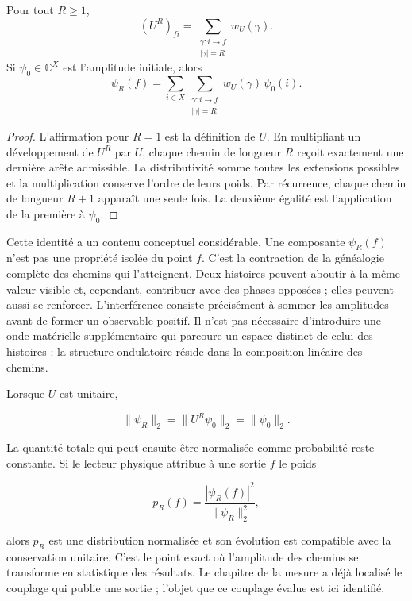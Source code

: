 \begin{theorem}
Pour tout \(R\geq 1\),
\[
  (U^R)_{fi}
  =
  \sum_{\substack{\gamma:i\to f\\|\gamma|=R}}
  w_U(\gamma).
\]
Si \(\psi_0\in\mathbb C^X\) est l'amplitude initiale, alors
\[
  \psi_R(f)
  =
  \sum_{i\in X}
  \sum_{\substack{\gamma:i\to f\\|\gamma|=R}}
  w_U(\gamma)\,\psi_0(i).
\]
\end{theorem}

\begin{proof}
L'affirmation pour \(R=1\) est la définition de \(U\). En multipliant un développement
de \(U^R\) par \(U\), chaque chemin de longueur \(R\) reçoit exactement une dernière
arête admissible. La distributivité somme toutes les extensions possibles et la
multiplication conserve l'ordre de leurs poids. Par récurrence, chaque chemin de longueur
\(R+1\) apparaît une seule fois. La deuxième égalité est l'application de la première à
\(\psi_0\).
\end{proof}

Cette identité a un contenu conceptuel considérable. Une composante
\(\psi_R(f)\) n'est pas une propriété isolée du point \(f\). C'est la contraction de la
généalogie complète des chemins qui l'atteignent. Deux histoires peuvent aboutir à la
même valeur visible et, cependant, contribuer avec des phases opposées ; elles peuvent aussi
se renforcer. L'interférence consiste précisément à sommer les amplitudes avant de
former un observable positif. Il n'est pas nécessaire d'introduire une onde matérielle
supplémentaire qui parcoure un espace distinct de celui des histoires : la structure
ondulatoire réside dans la composition linéaire des chemins.

Lorsque \(U\) est unitaire,

\[
  \|\psi_R\|_2=\|U^R\psi_0\|_2=\|\psi_0\|_2.
\]

La quantité totale qui peut ensuite être normalisée comme probabilité reste
constante. Si le lecteur physique attribue à une sortie \(f\) le poids

\[
  p_R(f)=\frac{|\psi_R(f)|^2}{\|\psi_R\|_2^2},
\]

alors \(p_R\) est une distribution normalisée et son évolution est compatible avec
la conservation unitaire. C'est le point exact où l'amplitude des chemins se
transforme en statistique des résultats. Le chapitre de la mesure a déjà localisé
le couplage qui publie une sortie ; l'objet que ce
couplage évalue est ici identifié.

